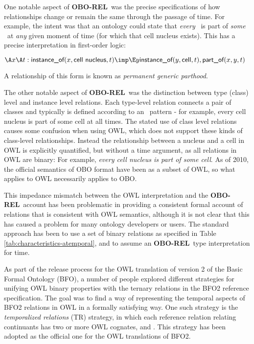 \documentclass{bioinfo}
\def\partOf{\pr{part\_of}}
\def\instanceOf{\pr{instance\_of}}
\def\CellNucleus{\pr{cell nucleus}}
\def\Cell{\pr{cell}}
\def\OBOREL{\textbf{OBO-REL}}
\begin{document}
One notable aspect of \OBOREL\ was the precise specifications of how
relationships change or remain the same through the passage of
time. For example, the intent was that an ontology could state that
\emph{every} \CellNucleus\ is part of \emph{some} \Cell\ at \emph{any}
given moment of time (for which that cell nucleus exists). This has a
precise interpretation in first-order logic:

$
\A x \A t : \instanceOf(x, \CellNucleus, t) \imp \\
 \E y \instanceOf(y, \Cell, t), \partOf(x,y,t)
$

A relationship of this form is known as \emph{permanent generic
  parthood}.

The other notable aspect of \OBOREL\ was the distinction between type
(class) level and instance level relations. Each type-level relation
connects a pair of classes and typically is defined according to an
\ pattern - for example, every cell nucleus is
part of some cell at all times. The stated use of class level
relations causes some confusion when using OWL, which does not support
these kinds of class-level relationships. Instead the relationship
between a nucleus and a cell in OWL is explicitly quantified, but
without a time argument, as all relations in OWL are binary: For
example, \emph{every cell nucleus is part of some cell}. As of 2010,
the official semantics of OBO format have been as a subset of OWL, so
what applies to OWL necessarily applies to OBO.

This impedance mismatch between the OWL interpretation and the
\OBOREL\ account has been problematic in providing a consistent
formal account of relations that is consistent with OWL semantics,
although it is not clear that this has caused a problem for many
ontology developers or users. The standard approach has been to use a
set of binary relations as specified in Table
\ref{tab:characteristics-atemporal}, and to assume an \OBOREL\ type
interpretation for time.

As part of the release process for the OWL translation of version 2 of
the Basic Formal Ontology (BFO)\cite{Grenon2004}, a number of people
explored different strategies for unifying OWL binary properties with
the ternary relations in the BFO2 reference
specification\cite{Graz}. The goal was to find a way of representing
the temporal aspects of BFO2 relations in OWL in a formally satisfying
way.  One such strategy is the \emph{temporalized relations} (TR)
strategy, in which each reference relation relating continuants has
two or more OWL cognates,  and
. This strategy has been adopted as the official
one for the OWL translations of BFO2.
\end{document}
